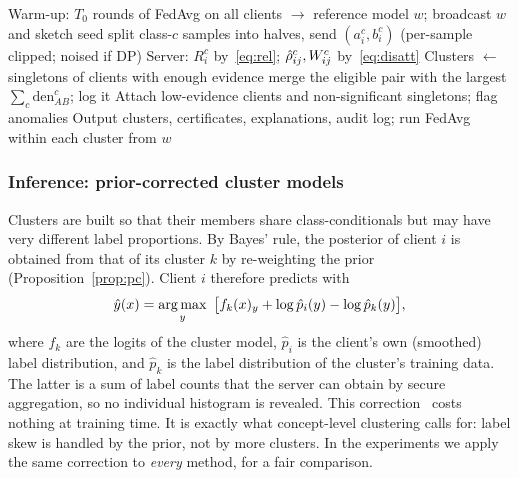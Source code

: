 \begin{algorithm}[t]
\caption{DisCo-CFL}\label{alg:disco}
\begin{algorithmic}[1]
\State Warm-up: $T_0$ rounds of FedAvg on all clients $\to$ reference model $w$; broadcast $w$ and sketch seed
 
  split class-$c$ samples into halves, send $(a_i^c,b_i^c)$ (per-sample clipped; noised if DP) \EndFor
\EndFor
\State Server: $R_i^c$ by~\eqref{eq:rel}; $\hat\rho^c_{ij},W^c_{ij}$ by~\eqref{eq:disatt}
\State Clusters $\gets$ singletons of clients with enough evidence
 merge the eligible pair with the largest $\sum_c\mathrm{den}^c_{AB}$; log it \EndWhile
\State Attach low-evidence clients and non-significant singletons; flag anomalies
\State Output clusters, certificates, explanations, audit log; run FedAvg within each cluster from $w$
\end{algorithmic}
\end{algorithm}

\subsubsection{Inference: prior-corrected cluster models}\label{sec:pc}
Clusters are built so that their members share class-conditionals but may have very different label proportions. By Bayes' rule, the posterior of client $i$ is obtained from that of its cluster $k$ by re-weighting the prior (Proposition~\ref{prop:pc}). Client $i$ therefore predicts with
\begin{equation}\label{eq:pc}
\hat y(x)=\operatorname*{arg\,max}_y\ \big[f_k(x)_y+\log\hat p_i(y)-\log\hat p_k(y)\big],
\end{equation}
where $f_k$ are the logits of the cluster model, $\hat p_i$ is the client's own (smoothed) label distribution, and $\hat p_k$ is the label distribution of the cluster's training data. The latter is a sum of label counts that the server can obtain by secure aggregation, so no individual histogram is revealed. This correction~\citep{lipton2018labelshift,menon2021logit} costs nothing at training time. It is exactly what concept-level clustering calls for: label skew is handled by the prior, not by more clusters. In the experiments we apply the same correction to \emph{every} method, for a fair comparison.


